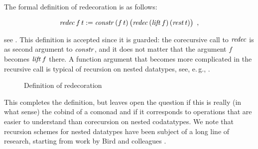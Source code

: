 The formal definition of redecoration is as follows:
\begin{definition}
$$\mathit{redec}\,f\,t:=\mathit{constr}\, (f\,t)\,\bigl(\mathit{redec}\,(\mathit{lift}\,f)\, (\mathit{rest}\,t)\bigr)\enspace,$$
\end{definition}
see . 
This definition is accepted since it is guarded: the corecursive
call to $\mathit{redec}$ is as second argument to $\mathit{constr}$, and it does not
matter that the argument $f$ becomes $\mathit{lift}\,f$ there. A function
argument that becomes more complicated in the recursive call is
typical of recursion on nested datatypes, see, e.\,g.,
\cite{grossestcspaper}.
\begin{figure}[h]
  \centering
  \caption{Definition of redecoration}
  \label{fig:redec}
\end{figure}

This completes the definition, but leaves open the question if this is
really (in what sense) the cobind of a comonad and if it corresponds
to operations that are easier to understand than corecursion on nested
codatatypes. We note that recursion schemes for nested datatypes have
been subject of a long line of research, starting from work by Bird
and colleagues
\cite{birdmeertens,gfolds}.


